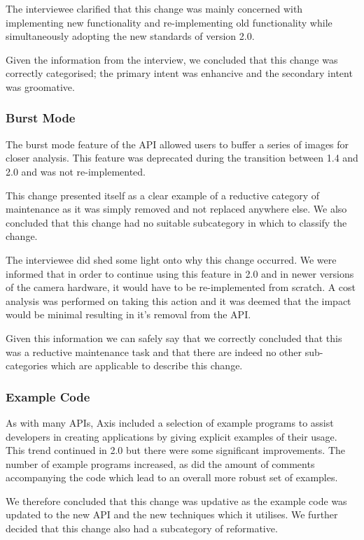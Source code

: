 \documentclass{sig-alternate}
\begin{document}
The interviewee clarified that this change was mainly concerned with implementing new functionality and re-implementing old functionality while simultaneously adopting the new standards of version 2.0. 

Given the information from the interview, we concluded that this change was correctly categorised; the primary intent was enhancive and the secondary intent was groomative.


\subsubsection{Burst Mode}

The burst mode feature of the API allowed users to buffer a series of images for closer analysis. This feature was deprecated during the transition between 1.4 and 2.0 and was not re-implemented.

This change presented itself as a clear example of a reductive category of maintenance as it was simply removed and not replaced anywhere else. We also concluded that this change had no suitable subcategory in which to classify the change.

The interviewee did shed some light onto why this change occurred. We were informed that in order to continue using this feature in 2.0 and in newer versions of the camera hardware, it would have to be re-implemented from scratch. A cost analysis was performed on taking this action and it was deemed that the impact would be minimal resulting in it's removal from the API.

Given this information we can safely say that we correctly concluded that this was a reductive maintenance task and that there are indeed no other sub-categories which are applicable to describe this change.


\subsubsection{Example Code}

As with many APIs, Axis included a selection of example programs to assist developers in creating applications by giving explicit examples of their usage. This trend continued in 2.0 but there were some significant improvements. The number of example programs increased, as did the amount of comments accompanying the code which lead to an overall more robust set of examples.

We therefore concluded that this change was updative as the example code was updated to the new API and the new techniques which it utilises. We further decided that this change also had a subcategory of reformative.
\end{document}
